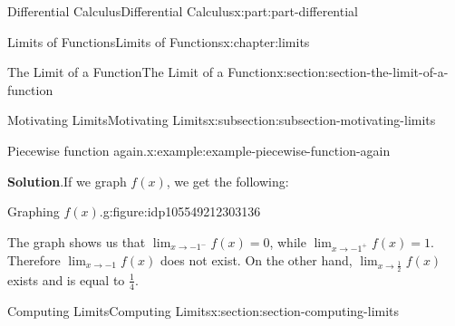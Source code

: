 \documentclass[twoside,10pt,]{book}
\newcommand{\blocktitlefont}{\relax}
\numberwithin{equation}{part}
\begin{document}
\begin{partptx}{Differential Calculus}{}{Differential Calculus}{}{}{x:part:part-differential}
\begin{chapterptx}{Limits of Functions}{}{Limits of Functions}{}{}{x:chapter:limits}
\begin{sectionptx}{The Limit of a Function}{}{The Limit of a Function}{}{}{x:section:section-the-limit-of-a-function}
\begin{subsectionptx}{Motivating Limits}{}{Motivating Limits}{}{}{x:subsection:subsection-motivating-limits}
\begin{example}{Piecewise function again.}{x:example:example-piecewise-function-again}
\par\smallskip%
\noindent\textbf{\blocktitlefont Solution}.\hypertarget{g:solution:idp105549212302368}{}\quad{}If we graph \(f(x)\), we get the following:%
\begin{figureptx}{Graphing \(f(x)\).}{g:figure:idp105549212303136}{}%
\begin{image}{0.25}{0.5}{0.25}%
%
\end{image}%
\tcblower
\end{figureptx}%
The graph shows us that \(\lim_{x\to-1^{-}}f(x) = 0\), while \(\lim_{x\to-1^{+}}f(x) = 1\). Therefore \(\lim_{x\to-1}f(x)\) does not exist. On the other hand, \(\lim_{x\to\frac{1}{2}}f(x)\) exists and is equal to \(\frac{1}{4}\).%
\end{example}
\end{subsectionptx}
\end{sectionptx}
%
%
\typeout{************************************************}
\typeout{************************************************}
%
\begin{sectionptx}{Computing Limits}{}{Computing Limits}{}{}{x:section:section-computing-limits}
\begin{introduction}{}%

\end{introduction}
\end{sectionptx}
\end{chapterptx}
\end{partptx}
\end{document}
